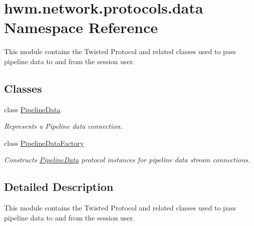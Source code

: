 \hypertarget{namespacehwm_1_1network_1_1protocols_1_1data}{\section{hwm.\-network.\-protocols.\-data Namespace Reference}
\label{namespacehwm_1_1network_1_1protocols_1_1data}
}


This module contains the Twisted Protocol and related classes used to pass pipeline data to and from the session user.  


\subsection*{Classes}
\begin{DoxyCompactItemize}
\item 
class \hyperlink{classhwm_1_1network_1_1protocols_1_1data_1_1_pipeline_data}{Pipeline\-Data}
\begin{DoxyCompactList}\small\item\em Represents a Pipeline data connection. \end{DoxyCompactList}\item 
class \hyperlink{classhwm_1_1network_1_1protocols_1_1data_1_1_pipeline_data_factory}{Pipeline\-Data\-Factory}
\begin{DoxyCompactList}\small\item\em Constructs \hyperlink{classhwm_1_1network_1_1protocols_1_1data_1_1_pipeline_data}{Pipeline\-Data} protocol instances for pipeline data stream connections. \end{DoxyCompactList}\end{DoxyCompactItemize}


\subsection{Detailed Description}
This module contains the Twisted Protocol and related classes used to pass pipeline data to and from the session user. 